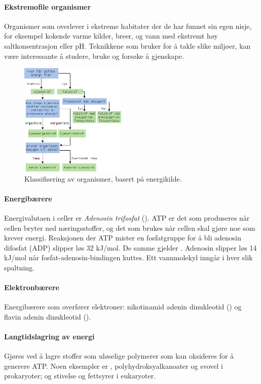 \paragraph{Ekstremofile organismer} Organismer som overlever i ekstreme habitater der de har funnet sin egen nisje, for eksempel kokende varme kilder, breer, og vann med ekstremt høy saltkonsentrasjon eller pH. Teknikkene som  bruker for å takle slike miljøer, kan være interessante å studere, bruke og forsøke å gjenskape.

\begin{figure}[H]
	\centering
	\includegraphics[width=0.45\textwidth]{metabolicdiversity}
	\caption{Klassifisering av organismer, basert på energikilde.}
	\label{fig:metabolicdiversity}
\end{figure}

\paragraph{Energibærere} Energivalutaen i celler er \emph{Adenosin trifosfat} (). ATP er det som produseres når cellen bryter ned næringsstoffer, og det som brukes når cellen skal gjøre noe som krever energi. Reaksjonen der ATP mister en fosfatgruppe for å bli adenosin difosfat (ADP) slipper løs 32 kJ/mol. De samme gjelder . Adenosin slipper løs 14 kJ/mol når fosfat-adenosin-bindingen kuttes. Ett vannmolekyl inngår i hver slik spaltning.

\paragraph{Elektronbærere} Energibærere som overfører elektroner: nikotinamid adenin dinukleotid () og flavin adenin dinukleotid ().

\paragraph{Langtidslagring av energi} Gjøres ved å lagre stoffer som uløselige polymerer som kan oksideres for å generere ATP. Noen eksempler er , polyhydroksyalkanoater og svovel i prokaryoter; og stivelse og fettsyrer i eukaryoter.

